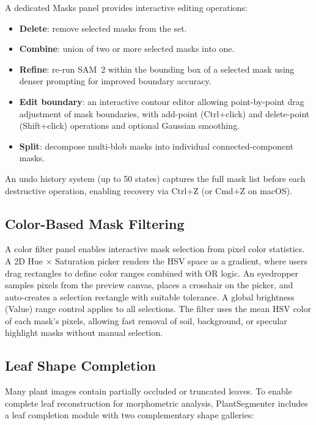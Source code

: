 \documentclass[12pt, a4paper]{article}
\begin{document}
A dedicated Masks panel provides interactive editing operations:

\begin{itemize}
    \item \textbf{Delete}: remove selected masks from the set.
    \item \textbf{Combine}: union of two or more selected masks into one.
    \item \textbf{Refine}: re-run SAM~2 within the bounding box of a selected
          mask using denser prompting for improved boundary accuracy.
    \item \textbf{Edit boundary}: an interactive contour editor allowing
          point-by-point drag adjustment of mask boundaries, with add-point
          (Ctrl+click) and delete-point (Shift+click) operations and optional
          Gaussian smoothing.
    \item \textbf{Split}: decompose multi-blob masks into individual
          connected-component masks.
\end{itemize}

An undo history system (up to 50 states) captures the full mask list before
each destructive operation, enabling recovery via Ctrl+Z (or Cmd+Z on macOS).

\subsection{Color-Based Mask Filtering}

A color filter panel enables interactive mask selection from pixel color statistics. A 2D Hue × Saturation picker renders the HSV space as a gradient, where users drag rectangles to define color ranges combined with OR logic. An eyedropper samples pixels from the preview canvas, places a crosshair on the picker, and auto-creates a selection rectangle with suitable tolerance. A global brightness (Value) range control applies to all selections. The filter uses the mean HSV color of each mask’s pixels, allowing fast removal of soil, background, or specular highlight masks without manual selection.

\subsection{Leaf Shape Completion}
\label{sec:completion}

Many plant images contain partially occluded or truncated leaves. To enable complete leaf reconstruction for morphometric analysis, PlantSegmenter includes a leaf completion module with two complementary shape galleries:
\end{document}
